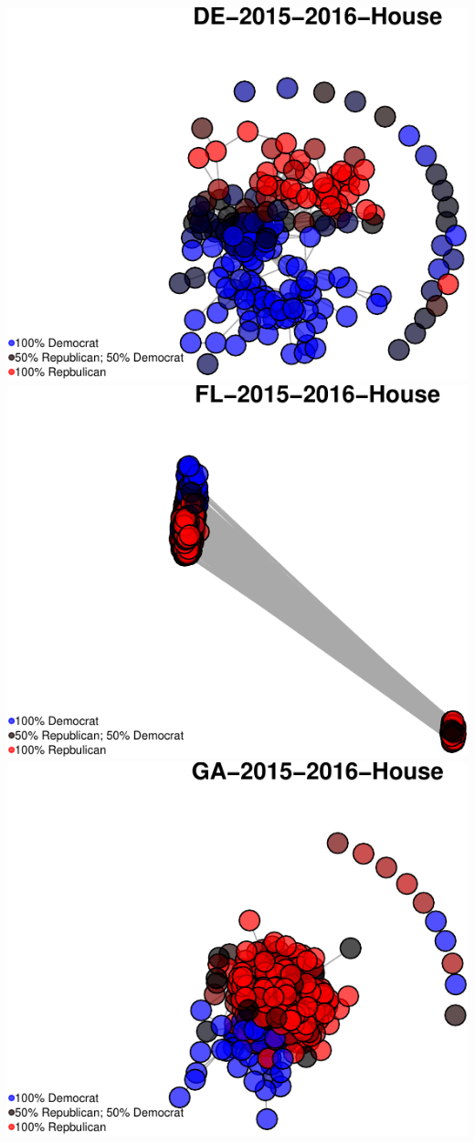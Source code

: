 \documentclass[]{article}
\begin{document}
\includegraphics{Final_Project_RMarkdown_Updated_files/figure-latex/unnamed-chunk-10-7.pdf}
\includegraphics{Final_Project_RMarkdown_Updated_files/figure-latex/unnamed-chunk-10-8.pdf}
\includegraphics{Final_Project_RMarkdown_Updated_files/figure-latex/unnamed-chunk-10-9.pdf}
\end{document}
